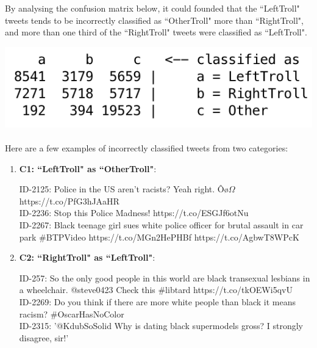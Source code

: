 \documentclass[11pt]{article}
\begin{document}
By analysing the confusion matrix below, it could founded that the ``LeftTroll" tweets tends to be incorrectly classified as ``OtherTroll" more than ``RightTroll", and more than one third of the ``RightTroll" tweets were classified as ``LeftTroll".


\includegraphics[scale=0.65]{"conf-matrix"}

\paragraph{} Here are a few examples of incorrectly classified tweets from two categories:

\begin{enumerate}

\item
\textbf{C1: ``LeftTroll" as ``OtherTroll"}:

ID-2125: Police in the US aren't racists? Yeah right. Ôø$\Omega$ https://t.co/PfG3hJAaHR \\

ID-2236: Stop this Police Madness!  https://t.co/ESGJf6otNu \\

ID-2267: Black teenage girl sues white police officer for brutal assault in car park \#BTPVideo  https://t.co/MGn2HePHBf https://t.co/AgbwT8WPcK


\item
\textbf{C2: ``RightTroll" as ``LeftTroll"}:

ID-257: So the only good people in this world are black transexual lesbians in a wheelchair. @steve0423 Check this \#libtard https://t.co/tkOEWi5qvU \\

ID-2269: Do you think if there are more white people than black it means racism?  \#OscarHasNoColor \\

ID-2315: ’@KdubSoSolid Why is dating black supermodels gross? I strongly disagree, sir!' \\

\end{enumerate}
\end{document}

